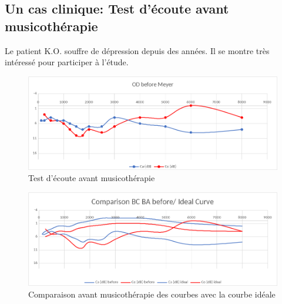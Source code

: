 \begin{enumerate}
     


\subsection{Un cas clinique: Test d'écoute avant musicothérapie}

 	Le patient K.O. souffre de dépression depuis des années. Il se montre très
        intéressé pour participer à l'étude.
 
 	
 	\begin{figure}[tbh]
 		\centering
 		\includegraphics[width=0.7\linewidth]{images/clinique/od_before_meyer.png}
 		\caption{Test d'écoute avant musicothérapie}
 		\label{fig:odbeforemeyer}
 	\end{figure}
 	

	
 	\begin{figure}
 		\centering
 		\includegraphics[width=0.7\linewidth]{images/clinique/comparison_bc_ba_before_vs_ideal_curve_meyer.png}
 		\caption[Comparaison avec la courbe idéale]{Comparaison avant
                  musicothérapie des
                  courbes  avec la courbe idéale}
 		\label{fig:comparisonbcbabeforevsidealcurvemeyer}
 	\end{figure}


	

\end{enumerate}
